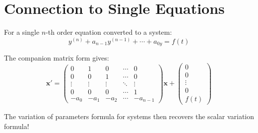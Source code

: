 \documentclass[12pt]{article}
\begin{document}
\section{Connection to Single Equations}

For a single $n$-th order equation converted to a system:
\[y^{(n)} + a_{n-1}y^{(n-1)} + \cdots + a_{0y} = f(t)\]

The companion matrix form gives:
\[\mathbf{x}' = \begin{pmatrix}
0 & 1 & 0 & \cdots & 0 \\
0 & 0 & 1 & \cdots & 0 \\
\vdots & \vdots & \vdots & \ddots & \vdots \\
0 & 0 & 0 & \cdots & 1 \\
-a_{0} & -a_{1} & -a_{2} & \cdots & -a_{n-1}
\end{pmatrix}\mathbf{x} + \begin{pmatrix} 0 \\ 0 \\ \vdots \\ 0 \\ f(t) \end{pmatrix}\]

The variation of parameters formula for systems then recovers the scalar variation formula!
\end{document}
